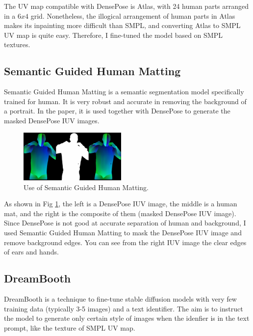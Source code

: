 \documentclass[acmtog]{acmart}
\begin{document}
The UV map compatible with DensePose is Atlas, with 24 human parts arranged in a \(6x4\) grid. Nonetheless, the illogical arrangement of human parts in Atlas makes its inpainting more difficult than SMPL, and converting Atlas to SMPL UV map is quite easy. Therefore, I fine-tuned the model based on SMPL textures.

\subsection{Semantic Guided Human Matting}

Semantic Guided Human Matting \cite{chen2022robust} is a semantic segmentation model specifically trained for human. It is very robust and accurate in removing the background of a portrait. In the paper, it is used together with DensePose to generate the masked DensePose IUV images.

\begin{figure}[h]
  \centering
  \includegraphics[width=0.47\textwidth]{figs/human_matting.png}
  \caption{Use of Semantic Guided Human Matting.}
  \label{fig:human_mat}
\end{figure}

As shown in Fig \ref{fig:human_mat}, the left is a DensePose IUV image, the middle is a human mat, and the right is the composite of them (masked DensePose IUV image). Since DensePose is not good at accurate separation of human and background, I used Semantic Guided Human Matting to mask the DensePose IUV image and remove background edges. You can see from the right IUV image the clear edges of ears and hands.

\subsection{DreamBooth}

DreamBooth \cite{ruiz2023dreambooth} is a technique to fine-tune stable diffusion models with very few training data (typically 3-5 images) and a text identifier. The aim is to instruct the model to generate only certain style of images when the idenfier is in the text prompt, like the texture of SMPL UV map.
\end{document}
